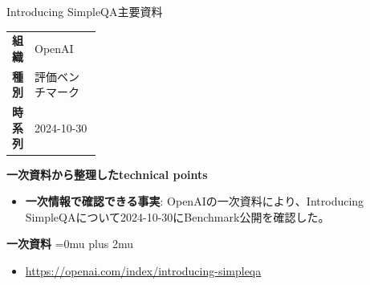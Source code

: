 \begin{technicalnote}{Introducing SimpleQA}{主要資料}
\begingroup
\begin{tabularx}{\linewidth}{@{}>{\bfseries}p{0.22\linewidth}X@{}}
組織 & OpenAI \\
種別 & 評価ベンチマーク \\
時系列 & 2024-10-30 \\
\end{tabularx}
\smallskip
{\bfseries 一次資料から整理したtechnical points}
\begin{itemize}[leftmargin=1.5em,itemsep=0.35em]
\item \textbf{一次情報で確認できる事実}: OpenAIの一次資料により、Introducing SimpleQAについて2024-10-30にBenchmark公開を確認した。
\end{itemize}
\begin{minipage}{\linewidth}
\begin{samepage}
{\bfseries 一次資料}
\begingroup\sloppy
\Urlmuskip=0mu plus 2mu\relax
\begin{itemize}[leftmargin=1.5em,itemsep=0.25em]
\item {\scriptsize\url{https://openai.com/index/introducing-simpleqa}}
\end{itemize}
\endgroup
\end{samepage}
\end{minipage}
\endgroup
\end{technicalnote}
\medskip

